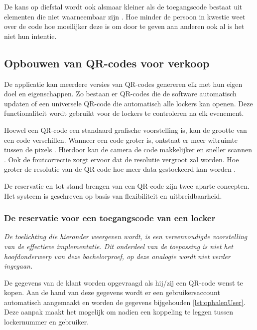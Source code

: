 De kans op diefstal wordt ook alsmaar kleiner als de toegangscode bestaat uit elementen die niet waarneembaar zijn \autocite{Baharav2013}. Hoe minder de persoon in kwestie weet over de code hoe moeilijker deze is om door te geven aan anderen ook al is het niet hun intentie.
\newpage
\subsection{Opbouwen van QR-codes voor verkoop}%
\label{sec:opbouwQR-codeVerkoop}

De applicatie kan meerdere versies van QR-codes genereren elk met hun eigen doel en eigenschappen. Zo bestaan er QR-codes die de software automatisch updaten of een universele QR-code die automatisch alle lockers kan openen. Deze functionaliteit wordt gebruikt voor de lockers te controleren na elk evenement. 

Hoewel een QR-code een standaard grafische voorstelling is, kan de grootte van een code verschillen. Wanneer een code groter is, ontstaat er meer witruimte tussen de pixels \autocite{Li2018}. Hierdoor kan de camera de code makkelijker en sneller scannen \autocite{Karrach2020}. Ook de foutcorrectie zorgt ervoor dat de resolutie vergroot zal worden. Hoe groter de resolutie van de QR-code hoe meer data gestockeerd kan worden \autocite{Chow2016}. 

De reservatie en tot stand brengen van een QR-code zijn twee aparte concepten. Het systeem is geschreven op basis van flexibiliteit en uitbreidbaarheid.

\subsubsection{De reservatie voor een toegangscode van een locker}%
\label{sec:opbouwQR-codeVerkoop1}

\textit {De toelichting die hieronder weergeven wordt, is een vereenvoudigde voorstelling van de effectieve implementatie. Dit onderdeel van de toepassing is niet het hoofdonderwerp van deze bachelorproef, op deze analogie wordt niet verder ingegaan.}

\vspace{7}
De gegevens van de klant worden opgevraagd als hij/zij een QR-code wenst te kopen. Aan de hand van deze gegevens wordt er een gebruikersaccount automatisch aangemaakt en worden de gegevens bijgehouden \ref{lst:ophalenUser}. Deze aanpak maakt het mogelijk om nadien een koppeling te leggen tussen lockernummer en gebruiker.

